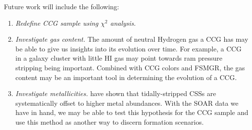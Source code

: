 \documentclass[iop,apj]{emulateapj}
\begin{document}
\noindent Future work will include the following:

\begin{enumerate}

\item \textit{Redefine CCG sample using $\chi^2$ analysis.} 

\item \textit{Investigate gas content.} The amount of neutral Hydrogen gas a CCG has may be able to give us insights into its evolution over time. For example, a CCG in a galaxy cluster with little HI gas may point towards ram pressure stripping being important. Combined with CCG colors and FSMGR, the gas content may be an important tool in determining the evolution of a CCG.

\item \textit{Investigate metallicities.} \citet{Janz2015} have shown that tidally-stripped CSSs are systematically offset to higher metal abundances. With the SOAR data we have in hand, we may be able to test this hypothesis for the CCG sample and use this method as another way to discern formation scenarios.

\end{enumerate}

\noindent {}




\appendix
\label{app}
\end{document}

